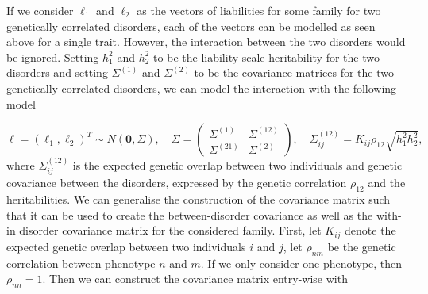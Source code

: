 If we consider $ \ell_1 $ and $ \ell_2 $ as the vectors of liabilities for some family for two genetically correlated disorders, each of the vectors can be modelled as seen above for a single trait. However, the interaction between the two disorders would be ignored. Setting $ h_1^2 $ and $ h_2^2 $ to be the liability-scale heritability for the two disorders and setting $ \Sigma^{(1)} $ and $ \Sigma^{(2)} $ to be the covariance matrices for the two genetically correlated disorders, we can model the interaction with the following model

\begin{equation*}
	\ell = \left(\ell_1, \ell_2\right)^T \sim N(\mathbf{0}, \Sigma), \quad \Sigma = 
	\begin{pmatrix} 
		\Sigma^{(1)} & \Sigma^{(12)} \\
		\Sigma^{(21)} & \Sigma^{(2)} 
	\end{pmatrix}, \quad \Sigma^{(12)}_{ij} = K_{ij}\rho_{12}\sqrt{h_1^2 h_2^2},
\end{equation*}
where $ \Sigma_{ij}^{(12)} $ is the expected genetic overlap between two individuals and genetic covariance between the disorders, expressed by the genetic correlation $ \rho_{12} $ and the heritabilities. We can generalise the construction of the covariance matrix such that it can be used to create the between-disorder covariance as well as the with-in disorder covariance matrix for the considered family. First, let $ K_{ij} $ denote the expected genetic overlap between two individuals $ i $ and $ j $, let $ \rho_{nm} $ be the genetic correlation between phenotype $ n $ and $ m $. If we only consider one phenotype, then $ \rho_{nn} = 1$. Then we can construct the covariance matrix entry-wise with 

